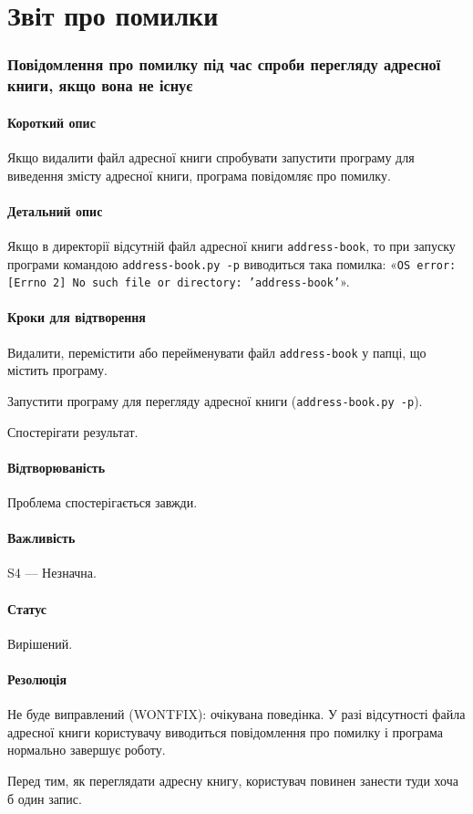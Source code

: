 \documentclass[a4paper,oneside,DIV=12,12pt]{scrartcl}
\newcommand\filename[1]{\texttt{#1}}
\newcommand\error[1]{\texttt{#1}}
\begin{document}
	\newpage
	\part{Звіт про помилки}
	\section{Повідомлення про помилку під час спроби перегляду адресної книги, якщо вона не існує}
		
		\subsection{Короткий опис}
				Якщо видалити файл адресної книги спробувати запустити програму для виведення змісту адресної книги, програма повідомляє про помилку.
				
		\subsection{Детальний опис}
				Якщо в директорії відсутній файл адресної книги \filename{address-book}, то при запуску програми командою \verb+address-book.py -p+ виводиться така помилка: «\error{OS error: [Errno 2] No such file or directory: 'address-book'}».
				
		\subsection{Кроки для відтворення}
			\begin{steps}
				\item Видалити, перемістити або перейменувати файл \filename{address-book} у папці, що містить програму.
				
				\item Запустити програму для перегляду адресної книги (\verb+address-book.py -p+).
				
				\item Спостерігати результат.
			\end{steps}
			
		\subsection{Відтворюваність}
			Проблема спостерігається завжди.
			
		\subsection{Важливість}
			S4 — Незначна.
			
		\subsection{Статус}
			Вирішений.
			
		\subsection{Резолюція}
			Не буде виправлений (WONTFIX): очікувана поведінка. У разі відсутності файла адресної книги користувачу виводиться повідомлення про помилку і програма нормально завершує роботу.
			
			Перед тим, як переглядати адресну книгу, користувач повинен занести туди хоча б один запис.
\end{document}
